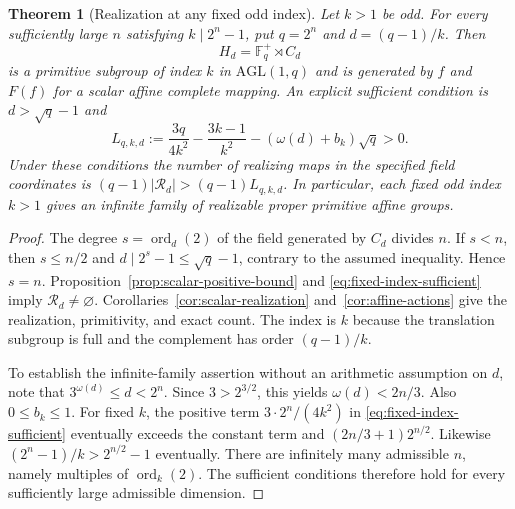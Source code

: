 \documentclass[11pt]{article}
\newtheorem{theorem}{Theorem}[section]
\begin{document}
\begin{theorem}[Realization at any fixed odd index]
\label{thm:fixed-index-realization}
Let $k>1$ be odd. For every sufficiently large $n$ satisfying
$k\mid2^n-1$, put $q=2^n$ and $d=(q-1)/k$. Then
\[
 H_d=\mathbb F_q^+\rtimes C_d
\]
is a primitive subgroup of index $k$ in $\mathrm{AGL}(1,q)$ and
is generated by $f$ and $F(f)$ for a scalar affine complete mapping.
An explicit sufficient condition is $d>\sqrt q-1$ and
\begin{equation}\label{eq:fixed-index-sufficient}
 L_{q,k,d}:=\frac{3q}{4k^2}-\frac{3k-1}{k^2}
 -(\omega(d)+b_k)\sqrt q>0.
\end{equation}
Under these conditions the number of realizing maps in the specified
field coordinates is $(q-1)|\mathcal R_d|>(q-1)L_{q,k,d}$.
In particular, each fixed odd index $k>1$ gives an infinite family of
realizable proper primitive affine groups.
\end{theorem}
\begin{proof}
The degree $s=\operatorname{ord}_d(2)$ of the field generated by $C_d$
divides $n$. If $s<n$, then $s\le n/2$ and
$d\mid2^s-1\le\sqrt q-1$, contrary to the assumed inequality.
Hence $s=n$. Proposition~\ref{prop:scalar-positive-bound} and
\eqref{eq:fixed-index-sufficient} imply $\mathcal R_d\ne\varnothing$.
Corollaries~\ref{cor:scalar-realization} and~\ref{cor:affine-actions}
give the realization, primitivity, and exact count. The index is $k$
because the translation subgroup is full and the complement has order
$(q-1)/k$.

To establish the infinite-family assertion without an arithmetic
assumption on $d$, note that $3^{\omega(d)}\le d<2^n$.
Since $3>2^{3/2}$, this yields $\omega(d)<2n/3$.
Also $0\le b_k\le1$. For fixed $k$, the positive term
$3\cdot2^n/(4k^2)$ in \eqref{eq:fixed-index-sufficient} eventually
exceeds the constant term and $(2n/3+1)2^{n/2}$.
Likewise $(2^n-1)/k>2^{n/2}-1$ eventually.
There are infinitely many admissible $n$, namely multiples of
$\operatorname{ord}_k(2)$. The sufficient conditions therefore hold
for every sufficiently large admissible dimension.
\end{proof}
\end{document}
